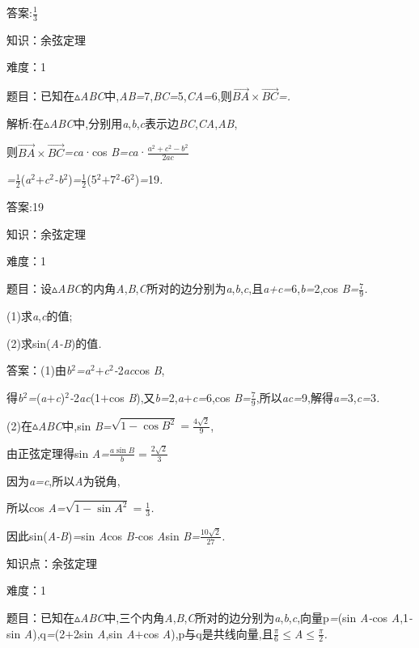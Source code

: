 \documentclass{article} %
\begin{document}
 答案:$\frac{1}{3}$

知识：余弦定理

难度：1

 题目：已知在$\mathrm{\vartriangle}$\textit{ABC}中,\textit{AB=}7,\textit{BC=}5,\textit{CA=}6,则$\vec{BA}\times\vec{BC}$\textit{=\underbar{　　　　　}.~}

 解析:在$\mathrm{\vartriangle}$\textit{ABC}中,分别用\textit{a},\textit{b},\textit{c}表示边\textit{BC},\textit{CA},\textit{AB},

则$\vec{BA}\times\vec{BC}$\textit{=ca}·cos \textit{B=ca}·$\frac{a^2+c^2-b^2}{2ac}$

\textit{=}$\frac{1}{2}$(\textit{a}${}^{2}$\textit{$+$c}${}^{2}$\textit{-b}${}^{2}$)\textit{=}$\frac{1}{2}$(5${}^{2}$\textit{$+$}7${}^{2}$\textit{-}6${}^{2}$)\textit{=}19\textit{.}

 答案:19

知识：余弦定理

难度：1

 题目：设$\mathrm{\vartriangle}$\textit{ABC}的内角\textit{A},\textit{B},\textit{C}所对的边分别为\textit{a},\textit{b},\textit{c},且\textit{a+c=}6,\textit{b=}2,cos \textit{B=}$\frac{7}{9}$\textit{.}

 (1)求\textit{a},\textit{c}的值;

 (2)求sin(\textit{A-B})的值\textit{.}

 答案：(1)由\textit{b}${}^{2}$\textit{=a}${}^{2}$\textit{$+$c}${}^{2}$\textit{-}2\textit{ac}cos \textit{B},

得\textit{b}${}^{2}$\textit{=}(\textit{a$+$c})${}^{2}$\textit{-}2\textit{ac}(1\textit{$+$}cos \textit{B}),又\textit{b=}2,\textit{a$+$c=}6,cos \textit{B=}$\frac{7}{9}$,所以\textit{ac=}9,解得\textit{a=}3,\textit{c=}3\textit{.}

(2)在$\mathrm{\vartriangle}$\textit{ABC}中,sin \textit{B=}$\sqrt{1-{\cos B}^2}=\frac{4\sqrt{2}}{9}$,

由正弦定理得sin \textit{A=}$\frac{a\sin B}{b}=\frac{2\sqrt{2}}{3}$

因为\textit{a=c},所以\textit{A}为锐角,

所以cos \textit{A=}$\sqrt{1-{\sin A}^2}=\frac{1}{3}$\textit{.}

因此sin(\textit{A-B})\textit{=}sin \textit{A}cos \textit{B-}cos \textit{A}sin \textit{B=}$\frac{10\sqrt{2}}{27}$\textit{.}

知识点：余弦定理

难度：1

 题目：已知在$\mathrm{\vartriangle}$\textit{ABC}中,三个内角\textit{A},\textit{B},\textit{C}所对的边分别为\textit{a},\textit{b},\textit{c},向量p\textit{=}(sin \textit{A-}cos \textit{A},1\textit{-}sin \textit{A}),q\textit{=}(2\textit{$+$}2sin \textit{A},sin \textit{A$+$}cos \textit{A}),p与q是共线向量,且$\frac{\pi}{6}$$\mathrm{\le}$\textit{A}$\mathrm{\le}$$\frac{\pi}{2}$\textit{.}
\end{document}
